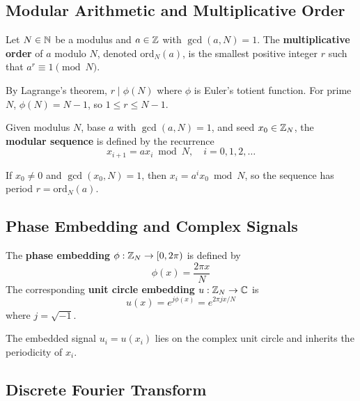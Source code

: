 \subsection{Modular Arithmetic and Multiplicative Order}

\begin{definition}
Let $N \in \mathbb{N}$ be a modulus and $a \in \mathbb{Z}$ with $\gcd(a,N) = 1$. The \textbf{multiplicative order} of $a$ modulo $N$, denoted $\text{ord}_N(a)$, is the smallest positive integer $r$ such that $a^r \equiv 1 \pmod{N}$.
\end{definition}

By Lagrange's theorem, $r \mid \phi(N)$ where $\phi$ is Euler's totient function. For prime $N$, $\phi(N) = N-1$, so $1 \leq r \leq N-1$.

\begin{definition}
Given modulus $N$, base $a$ with $\gcd(a,N)=1$, and seed $x_0 \in \mathbb{Z}_N$, the \textbf{modular sequence} is defined by the recurrence
\begin{equation}
x_{i+1} = a x_i \bmod N, \quad i = 0, 1, 2, \ldots
\end{equation}
\end{definition}

If $x_0 \neq 0$ and $\gcd(x_0, N) = 1$, then $x_i = a^i x_0 \bmod N$, so the sequence has period $r = \text{ord}_N(a)$.

\subsection{Phase Embedding and Complex Signals}

\begin{definition}
The \textbf{phase embedding} $\phi: \mathbb{Z}_N \to [0, 2\pi)$ is defined by
\begin{equation}
\phi(x) = \frac{2\pi x}{N}
\end{equation}
The corresponding \textbf{unit circle embedding} $u: \mathbb{Z}_N \to \mathbb{C}$ is
\begin{equation}
u(x) = e^{j\phi(x)} = e^{2\pi j x / N}
\end{equation}
where $j = \sqrt{-1}$.
\end{definition}

The embedded signal $u_i = u(x_i)$ lies on the complex unit circle and inherits the periodicity of $x_i$.

\subsection{Discrete Fourier Transform}


